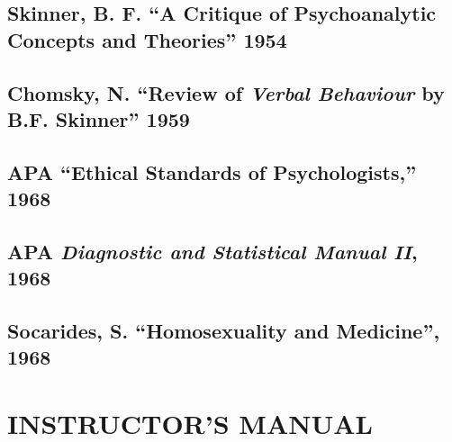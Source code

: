 \begin{appendices}
\label{app: Freud}


\chapter{Skinner, B. F. “A Critique of Psychoanalytic Concepts and Theories” 1954}
\label{skinnerb.f.“acritiqueofpsychoanalyticconceptsandtheories”1954}

\label{app: Skinner}


\chapter{Chomsky, N. “Review of \emph{Verbal Behaviour} by B.F. Skinner” 1959}
\label{chomskyn.“reviewofverbalbehaviourbyb.f.skinner”1959}

\label{app: Chomsky}


\chapter{APA “Ethical Standards of Psychologists,” 1968}
\label{apa“ethicalstandardsofpsychologists”1968}

\label{app: APAEthics}


\chapter{APA \emph{Diagnostic and Statistical Manual II}, 1968}
\label{apadiagnosticandstatisticalmanualii1968}

\label{app: DSMII}


\chapter{Socarides, S. “Homosexuality and Medicine”, 1968}
\label{socaridess.“homosexualityandmedicine”1968}

\label{app: DSMII}


\end{appendices}

\pagebreak 

\part{INSTRUCTOR'S MANUAL}
\label{instructorsmanual}

